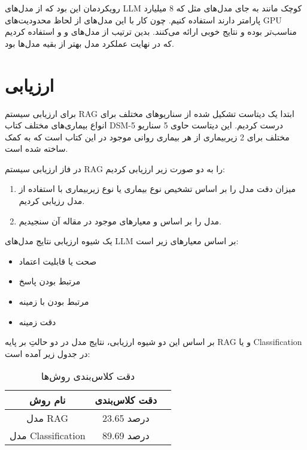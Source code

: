 \documentclass{CCI2020}
\begin{document}
رویکردمان این بود که از مدل‌های LLM کوچک مانند  به جای مدل‌های مثل  که 8 میلیارد پارامتر دارند استفاده کنیم. چون کار با این مدل‌های از لحاظ محدودیت‌های GPU مناسب‌تر بوده و نتایج خوبی ارائه می‌کنند. بدین ترتیب از مدل‌های  و \href{https://huggingface.co/facebook/opt-2.7b}{} و \href{https://huggingface.co/bigscience/bloom-3b}{} استفاده کردیم که در نهایت عملکرد مدل  بهتر از بقیه مدل‌ها بود.

\section{ارزیابی}
برای ارزیابی سیستم RAG ابتدا یک دیتاست تشکیل شده از سناریوهای مختلف برای انواع بیماری‌های مختلف کتاب DSM-5 درست کردیم. این دیتاست حاوی 5 سناریو مختلف برای 2 زیربیماری از هر بیماری روانی موجود در این کتاب است که به کمک  ساخته شده است.

در فاز ارزیابی سیستم RAG را به دو صورت زیر ارزیابی کردیم:
\begin{enumerate}
    \item میزان دقت مدل را بر اساس تشخیص نوع بیماری یا نوع زیربیماری با استفاده از مدل  رزیابی کردیم.
    \item مدل را بر اساس \cite{es2023ragas} و معیارهای موجود در مقاله آن سنجیدیم.
\end{enumerate}

 یک شیوه ارزیابی نتایج مدل‌های LLM بر اساس معیارهای زیر است:
\begin{itemize}
    \item صحت یا قابلیت اعتماد 
    \item مرتبط بودن پاسخ 
    \item مرتبط بودن با زمینه 
    \item دقت زمینه 
\end{itemize}


بر اساس این دو شیوه ارزیابی، نتایج مدل  در دو حالتِ بر پایه RAG و یا Classification در جدول زیر آمده است:

\begin{table}[h!]
\centering
\begin{tabular}{|c|c|c|}
\hline
 نام روش & دقت کلاس‌بندی  \\ \hline
مدل RAG & 23.65 درصد \\ \hline
مدل Classification & 89.69 درصد  \\ \hline
\end{tabular}
\caption{دقت کلاس‌بندی روش‌ها}
\label{tab:sample_table}
\end{table}
\end{document}

